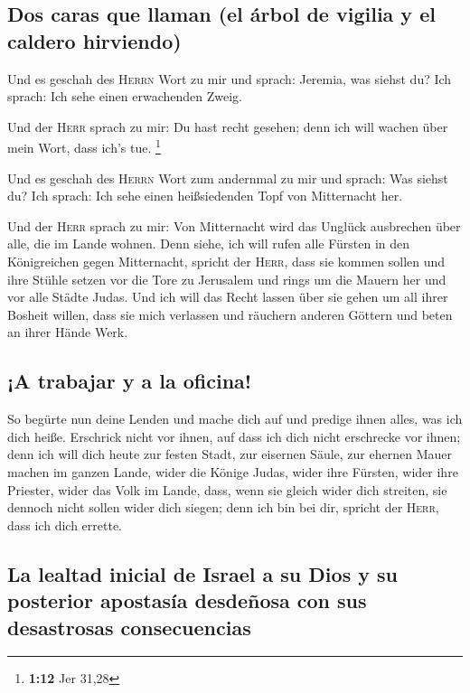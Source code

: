 \hypertarget{dos-caras-que-llaman-el-uxe1rbol-de-vigilia-y-el-caldero-hirviendo}{%
\subsection{Dos caras que llaman (el árbol de vigilia y el caldero
hirviendo)}\label{dos-caras-que-llaman-el-uxe1rbol-de-vigilia-y-el-caldero-hirviendo}}

 Und es geschah des \textsc{Herrn} Wort zu mir und
sprach: Jeremia, was siehst du? Ich sprach: Ich sehe einen erwachenden
Zweig.

 Und der \textsc{Herr} sprach zu mir: Du hast recht
gesehen; denn ich will wachen über mein Wort, dass ich's tue.
\footnote{\textbf{1:12} Jer 31,28}

 Und es geschah des \textsc{Herrn} Wort zum andernmal zu
mir und sprach: Was siehst du? Ich sprach: Ich sehe einen heißsiedenden
Topf von Mitternacht her.

 Und der \textsc{Herr} sprach zu mir: Von Mitternacht
wird das Unglück ausbrechen über alle, die im Lande wohnen.
 Denn siehe, ich will rufen alle Fürsten in den
Königreichen gegen Mitternacht, spricht der \textsc{Herr}, dass sie
kommen sollen und ihre Stühle setzen vor die Tore zu Jerusalem und rings
um die Mauern her und vor alle Städte Judas.  Und ich
will das Recht lassen über sie gehen um all ihrer Bosheit willen, dass
sie mich verlassen und räuchern anderen Göttern und beten an ihrer Hände
Werk.

\hypertarget{a-trabajar-y-a-la-oficina}{%
\subsection{¡A trabajar y a la
oficina!}\label{a-trabajar-y-a-la-oficina}}

 So begürte nun deine Lenden und mache dich auf und
predige ihnen alles, was ich dich heiße. Erschrick nicht vor ihnen, auf
dass ich dich nicht erschrecke vor ihnen;  denn ich will
dich heute zur festen Stadt, zur eisernen Säule, zur ehernen Mauer
machen im ganzen Lande, wider die Könige Judas, wider ihre Fürsten,
wider ihre Priester, wider das Volk im Lande,  dass, wenn
sie gleich wider dich streiten, sie dennoch nicht sollen wider dich
siegen; denn ich bin bei dir, spricht der \textsc{Herr}, dass ich dich
errette.

\hypertarget{la-lealtad-inicial-de-israel-a-su-dios-y-su-posterior-apostasuxeda-desdeuxf1osa-con-sus-desastrosas-consecuencias}{%
\subsection{La lealtad inicial de Israel a su Dios y su posterior
apostasía desdeñosa con sus desastrosas
consecuencias}\label{la-lealtad-inicial-de-israel-a-su-dios-y-su-posterior-apostasuxeda-desdeuxf1osa-con-sus-desastrosas-consecuencias}}

